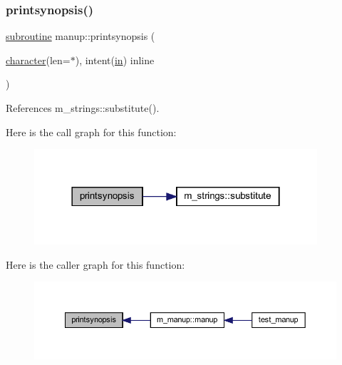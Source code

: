 \subsubsection{\texorpdfstring{printsynopsis()}{printsynopsis()}}
{\footnotesize\ttfamily \hyperlink{M__stopwatch_83_8txt_acfbcff50169d691ff02d4a123ed70482}{subroutine} manup\+::printsynopsis (\begin{DoxyParamCaption}\item[{\hyperlink{option__stopwatch_83_8txt_abd4b21fbbd175834027b5224bfe97e66}{character}(len=$\ast$), intent(\hyperlink{M__journal_83_8txt_afce72651d1eed785a2132bee863b2f38}{in})}]{inline }\end{DoxyParamCaption})\hspace{0.3cm}{\ttfamily [private]}}



References m\+\_\+strings\+::substitute().

Here is the call graph for this function\+:
\nopagebreak
\begin{figure}[H]
\begin{center}
\leavevmode
\includegraphics[width=298pt]{manup_8f90_aabf73d1c2ef02028690008788b8a1f9d_cgraph}
\end{center}
\end{figure}
Here is the caller graph for this function\+:
\nopagebreak
\begin{figure}[H]
\begin{center}
\leavevmode
\includegraphics[width=350pt]{manup_8f90_aabf73d1c2ef02028690008788b8a1f9d_icgraph}
\end{center}
\end{figure}
\mbox{\label{manup_8f90_a4b6c4dc9df113c44655bdf0f96ed6018}} 
